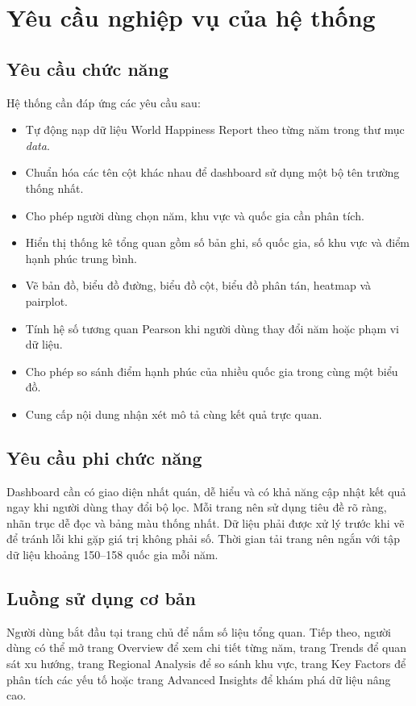 \section{Yêu cầu nghiệp vụ của hệ thống}

\subsection{Yêu cầu chức năng}

Hệ thống cần đáp ứng các yêu cầu sau:

\begin{itemize}
    \item Tự động nạp dữ liệu World Happiness Report theo từng năm trong thư mục \textit{data}.
    \item Chuẩn hóa các tên cột khác nhau để dashboard sử dụng một bộ tên trường thống nhất.
    \item Cho phép người dùng chọn năm, khu vực và quốc gia cần phân tích.
    \item Hiển thị thống kê tổng quan gồm số bản ghi, số quốc gia, số khu vực và điểm hạnh phúc trung bình.
    \item Vẽ bản đồ, biểu đồ đường, biểu đồ cột, biểu đồ phân tán, heatmap và pairplot.
    \item Tính hệ số tương quan Pearson khi người dùng thay đổi năm hoặc phạm vi dữ liệu.
    \item Cho phép so sánh điểm hạnh phúc của nhiều quốc gia trong cùng một biểu đồ.
    \item Cung cấp nội dung nhận xét mô tả cùng kết quả trực quan.
\end{itemize}

\subsection{Yêu cầu phi chức năng}

Dashboard cần có giao diện nhất quán, dễ hiểu và có khả năng cập nhật kết quả ngay khi người dùng thay đổi bộ lọc. Mỗi trang nên sử dụng tiêu đề rõ ràng, nhãn trục dễ đọc và bảng màu thống nhất. Dữ liệu phải được xử lý trước khi vẽ để tránh lỗi khi gặp giá trị không phải số. Thời gian tải trang nên ngắn với tập dữ liệu khoảng 150--158 quốc gia mỗi năm.

\subsection{Luồng sử dụng cơ bản}

Người dùng bắt đầu tại trang chủ để nắm số liệu tổng quan. Tiếp theo, người dùng có thể mở trang Overview để xem chi tiết từng năm, trang Trends để quan sát xu hướng, trang Regional Analysis để so sánh khu vực, trang Key Factors để phân tích các yếu tố hoặc trang Advanced Insights để khám phá dữ liệu nâng cao.

